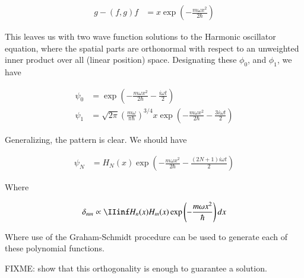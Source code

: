 \begin{align*}
g - (f,g) f 
&= x \exp\left( - \frac{m \omega x^2}{2 \hbar} \right)
\end{align*}

This leaves us with two wave function solutions to the Harmonic oscillator equation, where the spatial parts are orthonormal with respect to an unweighted inner product
over all (linear position) space.  Designating these $\phi_0$, and $\phi_1$, we have

\begin{align*}
\psi_0 &= \exp\left( - \frac{m \omega x^2}{2 \hbar} - \frac{i \omega t }{ 2} \right) \\
\psi_1 &= \sqrt{2\pi} \left(\frac{m \omega}{\pi\hbar}\right)^{3/4} x \exp\left( - \frac{m \omega x^2}{2 \hbar} - \frac{3 i \omega t }{ 2} \right)
\end{align*}

Generalizing, the pattern is clear.  We should have

\begin{align*}
\psi_N &= H_N(x) \exp\left( - \frac{m \omega x^2}{2 \hbar} - \frac{(2N + 1) i \omega t }{ 2} \right)
\end{align*}

Where 

\begin{align*}
\delta_{nm} \propto \IIinf H_n(x) H_m(x) \exp\left( - \frac{m \omega x^2}{\hbar} \right) dx
\end{align*}

Where use of the Graham-Schmidt procedure can be used to generate each of these polynomial functions.

FIXME: show that this orthogonality is enough to guarantee a solution.

%
%

%
